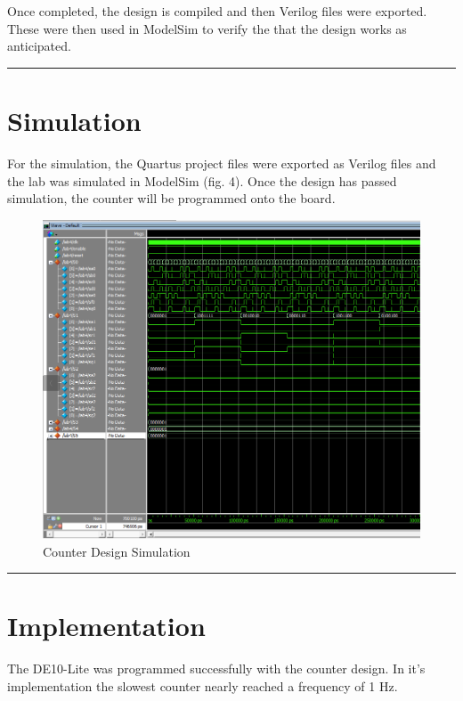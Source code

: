 \documentclass{article}
\begin{document}
Once completed, the design is compiled and then Verilog files were exported. These were then used in ModelSim to verify the that the design works as anticipated.

\vspace{5mm}
\hrule

\section*{\textcolor{mycolor}{Simulation}}
For the simulation, the Quartus project files were exported as Verilog files and the lab was simulated in ModelSim (fig. 4). Once the design has passed simulation, the counter will be programmed onto the board.
\begin{figure}[H]
  \centering
  \includegraphics*[width=1\linewidth]{modelsim.png}
  \caption{Counter Design Simulation}  
\end{figure}
\vspace{5mm}
\hrule

\section*{\textcolor{mycolor}{Implementation}}
The DE10-Lite was programmed successfully with the counter design. In it's implementation the slowest counter nearly reached a frequency of 1 Hz.
\end{document}
